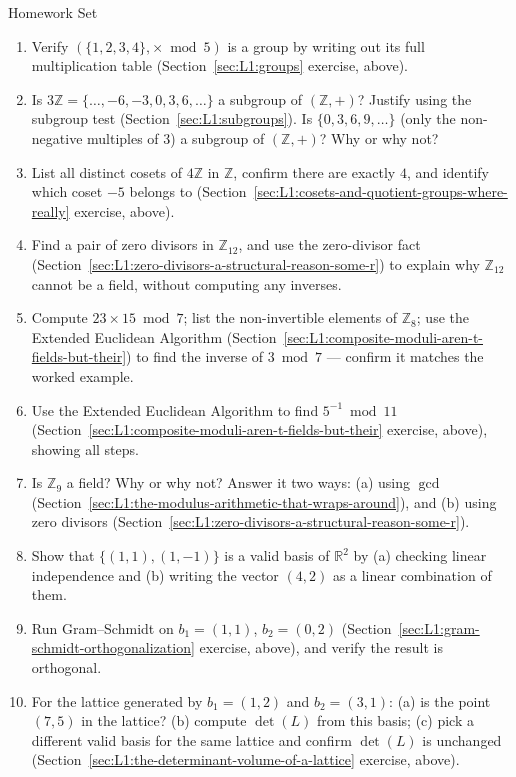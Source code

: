 \begin{exercisebox}{Homework Set}
\begin{enumerate}[leftmargin=*]
  \item Verify $(\{1,2,3,4\}, \times \bmod 5)$ is a group by writing out its full multiplication table (Section~\ref{sec:L1:groups} exercise, above).
  \item Is $3\mathbb{Z} = \{\ldots,-6,-3,0,3,6,\ldots\}$ a subgroup of $(\mathbb{Z},+)$? Justify using the subgroup test (Section~\ref{sec:L1:subgroups}). Is $\{0,3,6,9,\ldots\}$ (only the non-negative multiples of $3$) a subgroup of $(\mathbb{Z},+)$? Why or why not?
  \item List all distinct cosets of $4\mathbb{Z}$ in $\mathbb{Z}$, confirm there are exactly $4$, and identify which coset $-5$ belongs to (Section~\ref{sec:L1:cosets-and-quotient-groups-where-really} exercise, above).
  \item Find a pair of zero divisors in $\mathbb{Z}_{12}$, and use the zero-divisor fact (Section~\ref{sec:L1:zero-divisors-a-structural-reason-some-r}) to explain why $\mathbb{Z}_{12}$ cannot be a field, without computing any inverses.
  \item Compute $23 \times 15 \bmod 7$; list the non-invertible elements of $\mathbb{Z}_8$; use the Extended Euclidean Algorithm (Section~\ref{sec:L1:composite-moduli-aren-t-fields-but-their}) to find the inverse of $3 \bmod 7$ --- confirm it matches the worked example.
  \item Use the Extended Euclidean Algorithm to find $5^{-1} \bmod 11$ (Section~\ref{sec:L1:composite-moduli-aren-t-fields-but-their} exercise, above), showing all steps.
  \item Is $\mathbb{Z}_9$ a field? Why or why not? Answer it two ways: (a) using $\gcd$ (Section~\ref{sec:L1:the-modulus-arithmetic-that-wraps-around}), and (b) using zero divisors (Section~\ref{sec:L1:zero-divisors-a-structural-reason-some-r}).
  \item Show that $\{(1,1), (1,-1)\}$ is a valid basis of $\mathbb{R}^2$ by (a) checking linear independence and (b) writing the vector $(4,2)$ as a linear combination of them.
  \item Run Gram--Schmidt on $b_1=(1,1)$, $b_2=(0,2)$ (Section~\ref{sec:L1:gram-schmidt-orthogonalization} exercise, above), and verify the result is orthogonal.
  \item For the lattice generated by $b_1=(1,2)$ and $b_2=(3,1)$: (a) is the point $(7,5)$ in the lattice? (b) compute $\det(L)$ from this basis; (c) pick a different valid basis for the same lattice and confirm $\det(L)$ is unchanged (Section~\ref{sec:L1:the-determinant-volume-of-a-lattice} exercise, above).

\end{enumerate}
\end{exercisebox}
